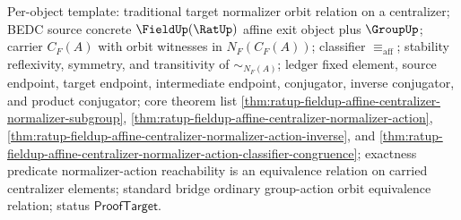 Per-object template: traditional target normalizer orbit relation on a
centralizer; BEDC source concrete $\FieldUp(\RatUp)$ affine exit object plus
$\GroupUp$; carrier $C_F(A)$ with orbit witnesses in $N_F(C_F(A))$;
classifier $\equiv_{\mathrm{aff}}$; stability reflexivity, symmetry, and
transitivity of $\sim_{N_F(A)}$; ledger fixed element, source endpoint, target
endpoint, intermediate endpoint, conjugator, inverse conjugator, and product
conjugator; core theorem list
\autoref{thm:ratup-fieldup-affine-centralizer-normalizer-subgroup},
\autoref{thm:ratup-fieldup-affine-centralizer-normalizer-action},
\autoref{thm:ratup-fieldup-affine-centralizer-normalizer-action-inverse}, and
\autoref{thm:ratup-fieldup-affine-centralizer-normalizer-action-classifier-congruence};
exactness predicate normalizer-action reachability is an equivalence relation
on carried centralizer elements; standard bridge ordinary group-action orbit
equivalence relation; status $\mathsf{ProofTarget}$.
